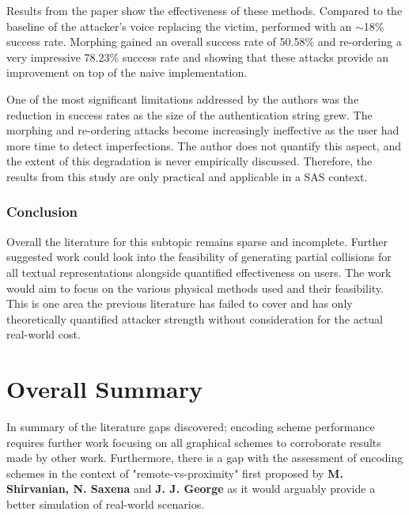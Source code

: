 Results from the paper show the effectiveness of these 
methods. Compared to the baseline of the attacker's voice 
replacing the victim, performed with an $\sim$18\% success rate. Morphing gained an overall success rate of 50.58\% and re-ordering a very impressive 78.23\% success rate and showing that these attacks provide an improvement on top of the naive implementation.

One of the most significant limitations addressed by the authors  was the reduction in success rates as the size of the authentication string grew. The morphing and re-ordering  attacks become increasingly ineffective as the user had more time to detect imperfections. The author does not quantify this aspect, and the extent of this degradation is never empirically discussed. Therefore, the results from this study are only practical and applicable in a SAS context.

\subsubsection*{Conclusion}
Overall the literature for this subtopic remains sparse and incomplete. Further suggested work could look into the feasibility of generating partial collisions for all textual representations alongside quantified effectiveness on users. The work would aim to focus on the various physical methods used and their feasibility. This is one area the previous literature has failed to cover and has only theoretically quantified attacker strength without consideration for the actual real-world cost.

\section{Overall Summary}
In summary of the literature gaps discovered; encoding scheme performance requires further work focusing on all graphical schemes to corroborate results made by other work. Furthermore, there is a gap with the assessment of encoding schemes in the context of "remote-vs-proximity" first proposed by \textbf{M. Shirvanian, N. Saxena} and \textbf{J. J. George}\cite{shirvanian2017pitfalls} as it would arguably provide a better simulation of real-world scenarios.

